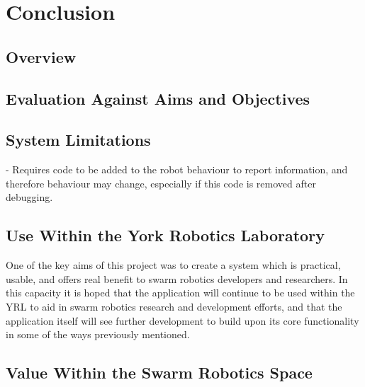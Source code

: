
\chapter[Conclusion]{Conclusion} %

\label{Chapter12} %


\section{Overview}



\section{Evaluation Against Aims and Objectives}



\section{System Limitations}

- Requires code to be added to the robot behaviour to report information, and therefore behaviour may change, especially if this code is removed after debugging.



\section{Use Within the York Robotics Laboratory}

One of the key aims of this project was to create a system which is practical, usable, and offers real benefit to swarm robotics developers and researchers. In this capacity it is hoped that the application will continue to be used within the YRL to aid in swarm robotics research and development efforts, and that the application itself will see further development to build upon its core functionality in some of the ways previously mentioned.


\section{Value Within the Swarm Robotics Space}


